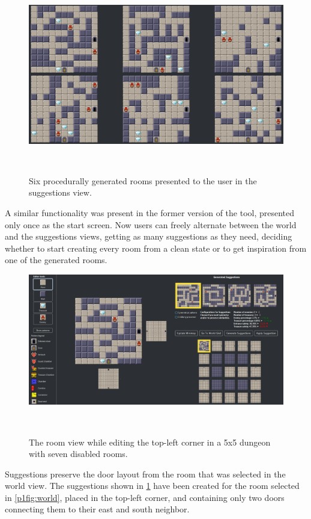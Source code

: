 \begin{figure}[!ht]
    \centering
    \includegraphics[width=\columnwidth]{included-papers-tex/paper-1/pap1-Figures/suggestionsview.png}
    \caption{Six procedurally generated rooms presented to the user in the suggestions view.}~\label{p1fig:suggestionsview}
\end{figure}

A similar functionality was present in the former version of the tool, presented only once as the start screen. Now users can freely alternate between the world and the suggestions views, getting as many suggestions as they need, deciding whether to start creating every room from a clean state or to get inspiration from one of the generated rooms.

\begin{figure}[t]
    \centering
    \includegraphics[width=\textwidth]{included-papers-tex/paper-1/pap1-Figures/roomview.png}
    \caption{The room view while editing the top-left corner in a 5x5 dungeon with seven disabled rooms.}~\label{p1fig:roomview}
\end{figure}

Suggestions preserve the door layout from the room that was selected in the world view. The suggestions shown in \cref{p1fig:suggestionsview} have been created for the room selected in \cref{p1fig:world}, placed in the top-left corner, and containing only two doors connecting them to their east and south neighbor.


